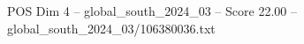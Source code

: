 \begin{textsample}{POS Dim 4 – global\_south\_2024\_03 – Score 22.00 – global\_south\_2024\_03/106380036.txt}
\end{textsample}
